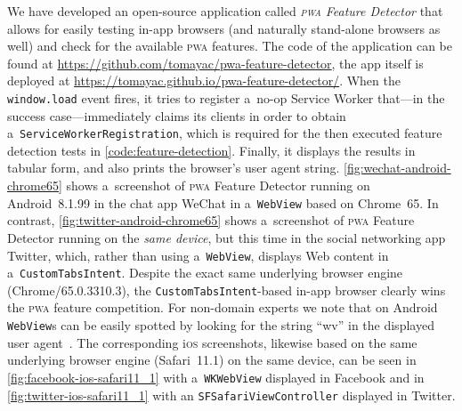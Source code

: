 \documentclass[sigconf]{acmart}
\begin{document}
We have developed an open-source application called \emph{\textsc{pwa} Feature Detector}
that allows for easily testing in-app browsers (and naturally stand-alone browsers as well)
and check for the available \textsc{pwa} features.
The code of the application can be found at
\url{https://github.com/tomayac/pwa-feature-detector},
the app itself is deployed at \url{https://tomayac.github.io/pwa-feature-detector/}.
When the \texttt{window.load} event fires,
it tries to register a~no-op Service Worker
that---in the success case---immediately claims its clients
in order to obtain a~\texttt{ServiceWorkerRegistration},
which is required for the then executed feature detection tests
in \autoref{code:feature-detection}.
Finally, it displays the results in tabular form,
and also prints the browser's user agent string.
\autoref{fig:wechat-android-chrome65} shows a~screenshot of \textsc{pwa} Feature Detector
running on Android~8.1.99 in the chat app WeChat in a~\texttt{WebView} based on Chrome~65.
In contrast, \autoref{fig:twitter-android-chrome65} shows
a~screenshot of \textsc{pwa} Feature Detector
running on the \emph{same device}, but this time in the social networking app Twitter,
which, rather than using a~\texttt{WebView},
displays Web content in a~\texttt{CustomTabsIntent}.
Despite the exact same underlying browser engine (Chrome/65.0.3310.3),
the \texttt{CustomTabsIntent}-based in-app browser
clearly wins the \textsc{pwa} feature competition.
For non-domain experts we note that on Android \texttt{WebView}s
can be easily spotted by looking for the string
``wv'' in the displayed user agent~\cite{chrome2018useragent}.
The corresponding i\textsc{os} screenshots, likewise
based on the same underlying browser engine (Safari~11.1) on the same device,
can be seen in \autoref{fig:facebook-ios-safari11_1} with a~\texttt{WKWebView} displayed in Facebook 
and in \autoref{fig:twitter-ios-safari11_1} with an \texttt{SFSafariViewController}
displayed in Twitter.
\end{document}
